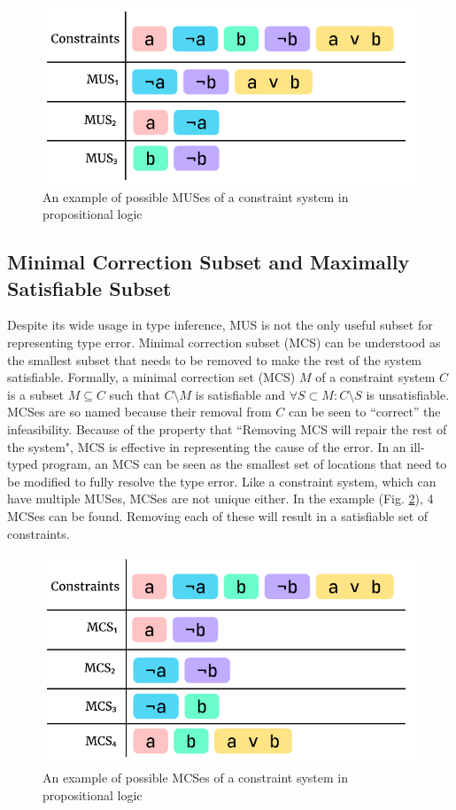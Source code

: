 \begin{figure}[hbt]
  \includegraphics[width=0.8\linewidth]{MUS}
  \caption{
    \label{fig:mus-example}
      An example of possible MUSes of a constraint system in propositional logic}
\end{figure}

\subsection{Minimal Correction Subset and Maximally Satisfiable Subset}

Despite its wide usage in type inference, MUS is not the only useful subset for representing type error. Minimal correction subset (MCS) can be understood as the smallest subset that needs to be removed to make the rest of the system satisfiable. Formally, a minimal correction set (MCS) $M$ of a constraint system $C$ is a subset $M \subseteq C$ such that $C \setminus M$ is satisfiable and $\forall{S} \subset M : C \setminus S$ is unsatisfiable. MCSes are so named because their removal from $C$ can be seen to “correct” the infeasibility. Because of the property that ``Removing MCS will repair the rest of the system", MCS is effective in representing the cause of the error. In an ill-typed program, an MCS can be seen as the smallest set of locations that need to be modified to fully resolve the type error.  Like a constraint system, which can have multiple MUSes, MCSes are not unique either. In the example (Fig. \ref{fig:mcs-example}), 4 MCSes can be found. Removing each of these will result in a satisfiable set of constraints. 

\begin{figure}[hbt]
  \includegraphics[width=0.8\linewidth]{MCS}
  \caption{
    \label{fig:mcs-example}
      An example of possible MCSes of a constraint system in propositional logic}
\end{figure}

